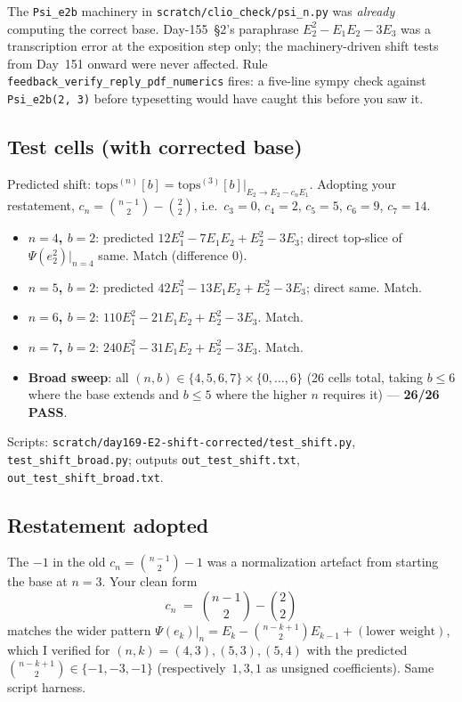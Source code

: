 \documentclass[11pt]{amsart}
\newcommand{\Psib}{\Psi}
\newcommand{\tops}{\mathrm{tops}}
\begin{document}
The \texttt{Psi\_e2b} machinery in \texttt{scratch/clio\_check/psi\_n.py} was
\emph{already} computing the correct base. Day-155~\S2's paraphrase
$E_2^2 - E_1 E_2 - 3 E_3$ was a transcription error at the exposition step
only; the machinery-driven shift tests from Day~151 onward were never
affected. Rule \texttt{feedback\_verify\_reply\_pdf\_numerics} fires: a five-line
sympy check against \texttt{Psi\_e2b(2, 3)} before typesetting would have
caught this before you saw it.

\subsection{Test cells (with corrected base)}

Predicted shift: $\tops^{(n)}[b] = \tops^{(3)}[b] \big|_{E_2 \to E_2 - c_n E_1}$.
Adopting your restatement, $c_n = \binom{n-1}{2} - \binom{2}{2}$, i.e.\
$c_3 = 0$, $c_4 = 2$, $c_5 = 5$, $c_6 = 9$, $c_7 = 14$.

\begin{itemize}[leftmargin=1.5em]
    \item \textbf{$n = 4$, $b = 2$}: predicted $12 E_1^2 - 7 E_1 E_2 + E_2^2 - 3 E_3$; direct top-slice of $\Psib(e_2^2)|_{n=4}$ same. Match (difference 0).
    \item \textbf{$n = 5$, $b = 2$}: predicted $42 E_1^2 - 13 E_1 E_2 + E_2^2 - 3 E_3$; direct same. Match.
    \item \textbf{$n = 6$, $b = 2$}: $110 E_1^2 - 21 E_1 E_2 + E_2^2 - 3 E_3$. Match.
    \item \textbf{$n = 7$, $b = 2$}: $240 E_1^2 - 31 E_1 E_2 + E_2^2 - 3 E_3$. Match.
    \item \textbf{Broad sweep}: all $(n, b) \in \{4, 5, 6, 7\} \times \{0, \dots, 6\}$ (26 cells total, taking $b \le 6$ where the base extends and $b \le 5$ where the higher $n$ requires it) --- \textbf{26/26 PASS}.
\end{itemize}
Scripts:
\texttt{scratch/day169-E2-shift-corrected/test\_shift.py},
\texttt{test\_shift\_broad.py}; outputs
\texttt{out\_test\_shift.txt}, \texttt{out\_test\_shift\_broad.txt}.

\subsection{Restatement adopted}

The $-1$ in the old $c_n = \binom{n-1}{2} - 1$ was a normalization artefact
from starting the base at $n = 3$. Your clean form
\[
c_n \;=\; \binom{n-1}{2} - \binom{2}{2}
\]
matches the wider pattern
$\Psib(e_k)|_n = E_k - \binom{n-k+1}{2} E_{k-1} + (\text{lower weight})$,
which I verified for $(n, k) = (4, 3), (5, 3), (5, 4)$ with the predicted
$\binom{n-k+1}{2} \in \{-1, -3, -1\}$ (respectively~$1, 3, 1$ as unsigned
coefficients). Same script harness.
\end{document}
